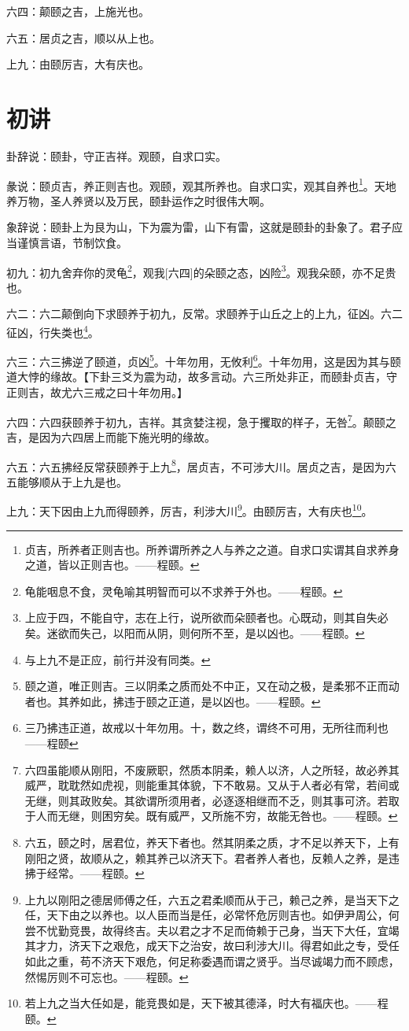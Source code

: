 \documentclass[12pt,oneside]{book}
\begin{document}
六四：颠颐之吉，上施光也。

六五：居贞之吉，顺以从上也。

上九：由颐厉吉，大有庆也。

\section{初讲}
卦辞说：颐卦，守正吉祥。观颐，自求口实。

彖说：颐贞吉，养正则吉也。观颐，观其所养也。自求口实，观其自养也\footnote{贞吉，所养者正则吉也。所养谓所养之人与养之之道。自求口实谓其自求养身之道，皆以正则吉也。——程颐。}。天地养万物，圣人养贤以及万民，颐卦运作之时很伟大啊。

象辞说：颐卦上为艮为山，下为震为雷，山下有雷，这就是颐卦的卦象了。君子应当谨慎言语，节制饮食。

初九：初九舍弃你的灵龟\footnote{龟能咽息不食，灵龟喻其明智而可以不求养于外也。——程颐。}，观我[六四]的朵颐之态，凶险\footnote{上应于四，不能自守，志在上行，说所欲而朵颐者也。心既动，则其自失必矣。迷欲而失己，以阳而从阴，则何所不至，是以凶也。——程颐。}。观我朵颐，亦不足贵也。

六二：六二颠倒向下求颐养于初九，反常。求颐养于山丘之上的上九，征凶。六二征凶，行失类也\footnote{与上九不是正应，前行并没有同类。}。

六三：六三拂逆了颐道，贞凶\footnote{颐之道，唯正则吉。三以阴柔之质而处不中正，又在动之极，是柔邪不正而动者也。其养如此，拂违于颐之正道，是以凶也。——程颐。}。十年勿用，无攸利\footnote{三乃拂违正道，故戒以十年勿用。十，数之终，谓终不可用，无所往而利也——程颐}。十年勿用，这是因为其与颐道大悖的缘故。【下卦三爻为震为动，故多言动。六三所处非正，而颐卦贞吉，守正则吉，故尤六三戒之曰十年勿用。】

六四：六四获颐养于初九，吉祥。其贪婪注视，急于攫取的样子，无咎\footnote{六四虽能顺从刚阳，不废厥职，然质本阴柔，赖人以济，人之所轻，故必养其威严，耽耽然如虎视，则能重其体貌，下不敢易。又从于人者必有常，若间或无继，则其政败矣。其欲谓所须用者，必逐逐相继而不乏，则其事可济。若取于人而无继，则困穷矣。既有威严，又所施不穷，故能无咎也。——程颐。}。颠颐之吉，是因为六四居上而能下施光明的缘故。

六五：六五拂经反常获颐养于上九\footnote{六五，颐之时，居君位，养天下者也。然其阴柔之质，才不足以养天下，上有刚阳之贤，故顺从之，赖其养己以济天下。君者养人者也，反赖人之养，是违拂于经常。——程颐。}，居贞吉，不可涉大川。居贞之吉，是因为六五能够顺从于上九是也。

上九：天下因由上九而得颐养，厉吉，利涉大川\footnote{上九以刚阳之德居师傅之任，六五之君柔顺而从于己，赖己之养，是当天下之任，天下由之以养也。以人臣而当是任，必常怀危厉则吉也。如伊尹周公，何尝不忧勤竞畏，故得终吉。夫以君之才不足而倚赖于己身，当天下大任，宜竭其才力，济天下之艰危，成天下之治安，故曰利涉大川。得君如此之专，受任如此之重，苟不济天下艰危，何足称委遇而谓之贤乎。当尽诚竭力而不顾虑，然惕厉则不可忘也。——程颐。}。由颐厉吉，大有庆也\footnote{若上九之当大任如是，能竞畏如是，天下被其德泽，时大有福庆也。——程颐。}。
\end{document}
